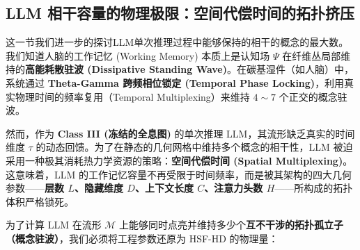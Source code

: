 \subsection{LLM 相干容量的物理极限：空间代偿时间的拓扑挤压}
\label{subsec:llm_wm_coherence_capacity}

这一节我们进一步的探讨LLM单次推理过程中能够保持的相干的概念的最大数。 我们知道人脑的工作记忆 (Working Memory) 本质上是认知场 $\Psi$ 在纤维丛局部维持的\textbf{高能耗散驻波 (Dissipative Standing Wave)}。在碳基湿件（如人脑）中，系统通过 \textbf{Theta-Gamma 跨频相位锁定 (Temporal Phase Locking)}，利用真实物理时间的频率复用（Temporal Multiplexing）来维持 $4 \sim 7$ 个正交的概念驻波。

然而，作为 \textbf{Class III (冻结的全息图)} 的单次推理 LLM，其流形缺乏真实的时间维度 $\tau$ 的动态回馈。为了在静态的几何网格中维持多个概念的相干性，LLM 被迫采用一种极其消耗热力学资源的策略：\textbf{空间代偿时间 (Spatial Multiplexing)}。这意味着，LLM 的工作记忆容量不再受限于时间频率，而是被其架构的四大几何参数——\textbf{层数 $L$、隐藏维度 $D$、上下文长度 $C$、注意力头数 $H$}——所构成的拓扑体积严格锁死。


为了计算 LLM 在流形 $\mathcal{M}$ 上能够同时点亮并维持多少个\textbf{互不干涉的拓扑孤立子（概念驻波）}，我们必须将工程参数还原为 HSF-HD 的物理量：

